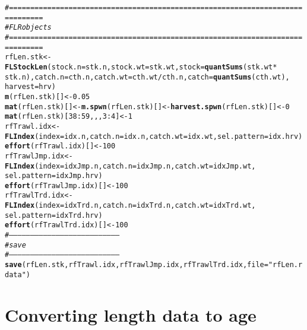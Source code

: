 \documentclass[a4paper,english,10pt]{article}\usepackage[]{graphicx}\usepackage[]{color}
\makeatletter
\newcommand{\hlnum}[1]{\textcolor[rgb]{0.686,0.059,0.569}{#1}}%
\newcommand{\hlstr}[1]{\textcolor[rgb]{0.192,0.494,0.8}{#1}}%
\newcommand{\hlcom}[1]{\textcolor[rgb]{0.678,0.584,0.686}{\textit{#1}}}%
\newcommand{\hlopt}[1]{\textcolor[rgb]{0,0,0}{#1}}%
\newcommand{\hlstd}[1]{\textcolor[rgb]{0.345,0.345,0.345}{#1}}%
\newcommand{\hlkwb}[1]{\textcolor[rgb]{0.69,0.353,0.396}{#1}}%
\newcommand{\hlkwc}[1]{\textcolor[rgb]{0.333,0.667,0.333}{#1}}%
\newcommand{\hlkwd}[1]{\textcolor[rgb]{0.737,0.353,0.396}{\textbf{#1}}}%
\newenvironment{kframe}{%
 \def\at@end@of@kframe{}%
 \ifinner\ifhmode%
  \def\at@end@of@kframe{\end{minipage}}%
  \begin{minipage}{\columnwidth}%
 \fi\fi%
 \def\FrameCommand##1{\hskip\@totalleftmargin \hskip-\fboxsep
 \colorbox{shadecolor}{##1}\hskip-\fboxsep
     \hskip-\linewidth \hskip-\@totalleftmargin \hskip\columnwidth}%
 \MakeFramed {\advance\hsize-\width
   \@totalleftmargin\z@ \linewidth\hsize
   \@setminipage}}%
 {\par\unskip\endMakeFramed%
 \at@end@of@kframe}
\newenvironment{knitrout}{}{} %
\makeatother
\begin{document}
\begin{knitrout}
\color{fgcolor}\begin{kframe}
\begin{alltt}
\hlcom{# ==============================================================================}
\hlcom{# FLR objects}
\hlcom{# ==============================================================================}
\hlstd{rfLen.stk} \hlkwb{<-} \hlkwd{FLStockLen}\hlstd{(}\hlkwc{stock.n} \hlstd{= stk.n,} \hlkwc{stock.wt} \hlstd{= stk.wt,} \hlkwc{stock} \hlstd{=} \hlkwd{quantSums}\hlstd{(stk.wt} \hlopt{*}
    \hlstd{stk.n),} \hlkwc{catch.n} \hlstd{= cth.n,} \hlkwc{catch.wt} \hlstd{= cth.wt}\hlopt{/}\hlstd{cth.n,} \hlkwc{catch} \hlstd{=} \hlkwd{quantSums}\hlstd{(cth.wt),}
    \hlkwc{harvest} \hlstd{= hrv)}
\hlkwd{m}\hlstd{(rfLen.stk)[]} \hlkwb{<-} \hlnum{0.05}
\hlkwd{mat}\hlstd{(rfLen.stk)[]} \hlkwb{<-} \hlkwd{m.spwn}\hlstd{(rfLen.stk)[]} \hlkwb{<-} \hlkwd{harvest.spwn}\hlstd{(rfLen.stk)[]} \hlkwb{<-} \hlnum{0}
\hlkwd{mat}\hlstd{(rfLen.stk)[}\hlnum{38}\hlopt{:}\hlnum{59}\hlstd{, , ,} \hlnum{3}\hlopt{:}\hlnum{4}\hlstd{]} \hlkwb{<-} \hlnum{1}
\hlstd{rfTrawl.idx} \hlkwb{<-} \hlkwd{FLIndex}\hlstd{(}\hlkwc{index} \hlstd{= idx.n,} \hlkwc{catch.n} \hlstd{= idx.n,} \hlkwc{catch.wt} \hlstd{= idx.wt,} \hlkwc{sel.pattern} \hlstd{= idx.hrv)}
\hlkwd{effort}\hlstd{(rfTrawl.idx)[]} \hlkwb{<-} \hlnum{100}
\hlstd{rfTrawlJmp.idx} \hlkwb{<-} \hlkwd{FLIndex}\hlstd{(}\hlkwc{index} \hlstd{= idxJmp.n,} \hlkwc{catch.n} \hlstd{= idxJmp.n,} \hlkwc{catch.wt} \hlstd{= idxJmp.wt,}
    \hlkwc{sel.pattern} \hlstd{= idxJmp.hrv)}
\hlkwd{effort}\hlstd{(rfTrawlJmp.idx)[]} \hlkwb{<-} \hlnum{100}
\hlstd{rfTrawlTrd.idx} \hlkwb{<-} \hlkwd{FLIndex}\hlstd{(}\hlkwc{index} \hlstd{= idxTrd.n,} \hlkwc{catch.n} \hlstd{= idxTrd.n,} \hlkwc{catch.wt} \hlstd{= idxTrd.wt,}
    \hlkwc{sel.pattern} \hlstd{= idxTrd.hrv)}
\hlkwd{effort}\hlstd{(rfTrawlTrd.idx)[]} \hlkwb{<-} \hlnum{100}
\hlcom{# ------------------------------------------------------------------------------}
\hlcom{# save}
\hlcom{# ------------------------------------------------------------------------------}
\hlkwd{save}\hlstd{(rfLen.stk, rfTrawl.idx, rfTrawlJmp.idx, rfTrawlTrd.idx,} \hlkwc{file} \hlstd{=} \hlstr{"rfLen.rdata"}\hlstd{)}
\end{alltt}
\end{kframe}
\end{knitrout}


\section{Converting length data to age}
\end{document}
